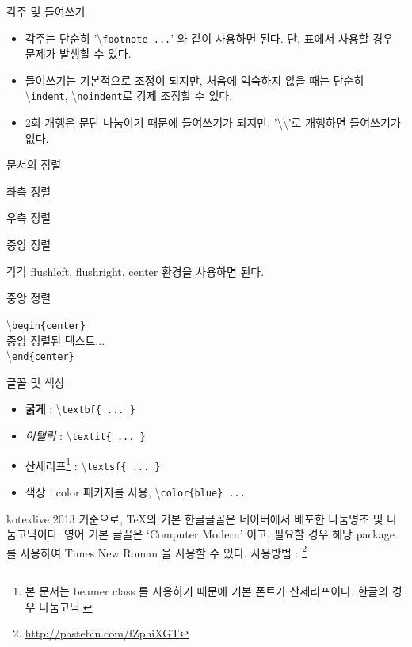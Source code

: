 \documentclass[12pt]{gshs_lecture}
\newenvironment{codeblock}[1]{
	\begin{block}{#1}
		\setstretch{1.0}
		\begin{small}
}{
		\end{small}
	\end{block}
}
\begin{document}
\begin{frame}[t]{각주 및 들여쓰기}
	\begin{itemize}
		\item 각주는 단순히 '\textbackslash \texttt{footnote{ ...}}' 와 같이 사용하면 된다. 단, 표에서 사용할 경우 문제가 발생할 수 있다.
		\vskip 1pc
		
		\item 들여쓰기는 기본적으로 조정이 되지만, 처음에 익숙하지 않을 때는 단순히 
		\textbackslash \texttt{indent}, \textbackslash \texttt{noindent}로 강제 조정할 수 있다.
		
		\vskip 1pc
		\item 2회 개행은 문단 나눔이기 때문에 들여쓰기가 되지만, '\textbackslash \textbackslash'로 
		개행하면 들여쓰기가 없다. 
	\end{itemize}
	
\end{frame}

\begin{frame}[t]{문서의 정렬}
	\begin{flushleft}
		좌측 정렬
	\end{flushleft}
	\begin{flushright}
		우측 정렬
	\end{flushright}
	\begin{center}
		중앙 정렬
	\end{center}
	각각 flushleft, flushright, center 환경을 사용하면 된다.
	
	\begin{codeblock}{중앙 정렬}
	\textbackslash \texttt{begin\{center\}}\\
	\hspace{6mm} 중앙 정렬된 텍스트...\\
	\textbackslash \texttt{end\{center\}}
	\end{codeblock}
\end{frame}

\begin{frame}[t]{글꼴 및 색상}
	\begin{itemize}
		\item \textbf{굵게} : \textbackslash \texttt{textbf\{ ... \}}
		\item \textit{이탤릭} : \textbackslash \texttt{textit\{ ... \}}
		\item \textsf{산세리프}\footnote[frame]{본 문서는 beamer class 를 
			사용하기 때문에 기본 폰트가 산세리프이다. 한글의 경우 
			나눔고딕.} : \textbackslash \texttt{textsf\{ ... \}}
		\item {\color{blue} 색상} : color 패키지를 사용,
		\textbackslash \texttt{color\{blue\} ... }
	\end{itemize}
	kotexlive 2013 기준으로, \TeX 의 기본 한글글꼴은 네이버에서 배포한 나눔명조 및 나눔고딕이다. 영어 기본 글꼴은 `Computer Modern' 이고, 필요할 경우 해당 package 를 사용하여 Times New Roman 을 사용할 수 있다. 사용방법 : \footnote[frame]{\url{http://pastebin.com/fZphiXGT}}
\end{frame}
\end{document}
